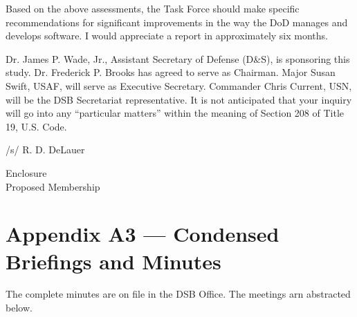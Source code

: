 \documentclass[12pt,final]{article}
\begin{document}
Based on the above assessments, the Task Force should make specific
recommendations for significant improvements in the way the DoD manages and
develops software.  I would appreciate a report in approximately six months.

Dr. James P. Wade, Jr., Assistant Secretary of Defense (D\&S), is sponsoring
this study. Dr. Frederick P. Brooks has agreed to serve as Chairman.  Major
Susan Swift, USAF, will serve as Executive Secretary.  Commander Chris Current,
USN, will be the DSB Secretariat representative.  It is not anticipated that
your inquiry will go into any “particular matters” within the meaning of
Section 208 of Title 19, U.S. Code.

\begin{center}
    /s/ R. D. DeLauer
\end{center}

\noindent Enclosure\\
\hspace*{1ex}Proposed Membership

\newpage

\section*{Appendix A3 — Condensed Briefings and Minutes}


The complete minutes are on file in the DSB Office. The meetings arn abstracted
below.

~
\end{document}
